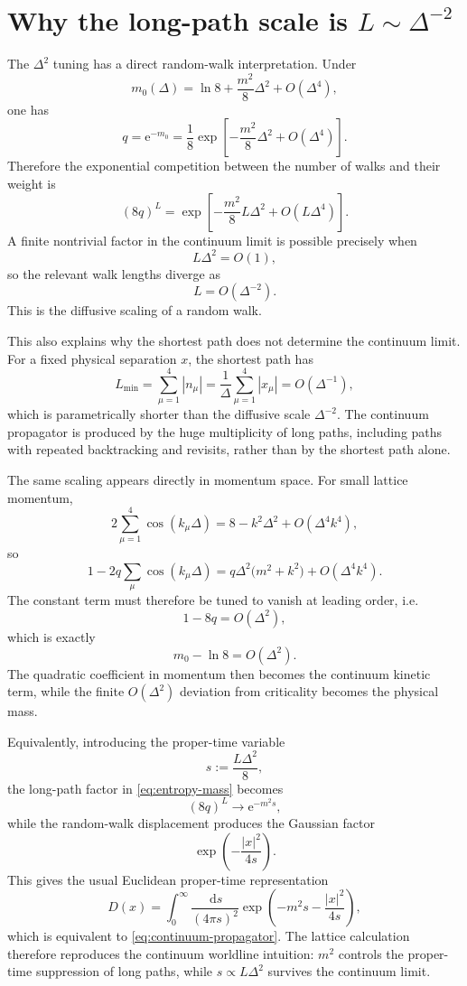 \documentclass[11pt]{article}
\newcommand{\e}{\mathrm e}
\newcommand{\dd}{\,\mathrm d}
\begin{document}
	\section{Why the long-path scale is $L\sim\Delta^{-2}$}
	The $\Delta^2$ tuning has a direct random-walk interpretation. Under
	\[
	m_0(\Delta)=\ln8+\frac{m^2}{8}\Delta^2+O(\Delta^4),
	\]
	one has
	\[
	q=\e^{-m_0}
	=\frac18\exp\!\left[-\frac{m^2}{8}\Delta^2+O(\Delta^4)\right].
	\]
	Therefore the exponential competition between the number of walks and their weight is
	\begin{equation}
		\label{eq:entropy-mass}
		(8q)^L
		=\exp\!\left[-\frac{m^2}{8}L\Delta^2+O(L\Delta^4)\right].
	\end{equation}
	A finite nontrivial factor in the continuum limit is possible precisely when
	\[
	\boxed{L\Delta^2=O(1),}
	\]
	so the relevant walk lengths diverge as
	\[
	L=O(\Delta^{-2}).
	\]
	This is the diffusive scaling of a random walk.
	
	This also explains why the shortest path does not determine the continuum limit. For a fixed physical separation $x$, the shortest path has
	\[
	L_{\min}
	=\sum_{\mu=1}^4|n_\mu|
	=\frac1\Delta\sum_{\mu=1}^4|x_\mu|
	=O(\Delta^{-1}),
	\]
	which is parametrically shorter than the diffusive scale $\Delta^{-2}$. The continuum propagator is produced by the huge multiplicity of long paths, including paths with repeated backtracking and revisits, rather than by the shortest path alone.
	
	The same scaling appears directly in momentum space. For small lattice momentum,
	\[
	2\sum_{\mu=1}^4\cos(k_\mu\Delta)
	=8-k^2\Delta^2+O(\Delta^4k^4),
	\]
	so
	\[
	1-2q\sum_\mu\cos(k_\mu\Delta)
	=q\Delta^2\bigl(m^2+k^2\bigr)+O(\Delta^4k^4).
	\]
	The constant term must therefore be tuned to vanish at leading order, i.e.
	\[
	1-8q=O(\Delta^2),
	\]
	which is exactly
	\[
	m_0-\ln8=O(\Delta^2).
	\]
	The quadratic coefficient in momentum then becomes the continuum kinetic term, while the finite $O(\Delta^2)$ deviation from criticality becomes the physical mass.
	
	Equivalently, introducing the proper-time variable
	\[
	s:=\frac{L\Delta^2}{8},
	\]
	the long-path factor in \eqref{eq:entropy-mass} becomes
	\[
	(8q)^L\longrightarrow \e^{-m^2s},
	\]
	while the random-walk displacement produces the Gaussian factor
	\[
	\exp\!\left(-\frac{|x|^2}{4s}\right).
	\]
	This gives the usual Euclidean proper-time representation
	\begin{equation}
		\label{eq:proper-time}
		D(x)
		=\int_0^\infty\frac{\dd s}{(4\pi s)^2}
		\exp\!\left(-m^2s-\frac{|x|^2}{4s}\right),
	\end{equation}
	which is equivalent to \eqref{eq:continuum-propagator}. The lattice calculation therefore reproduces the continuum worldline intuition: $m^2$ controls the proper-time suppression of long paths, while $s\propto L\Delta^2$ survives the continuum limit.
	
\end{document}
